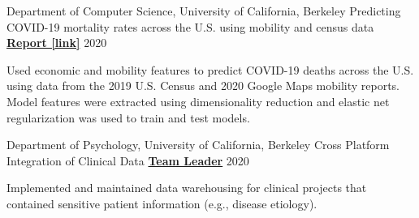 \begin{cventries}
  \cventry
    {Department of Computer Science, University of California, Berkeley} %
    {Predicting COVID-19 mortality rates across the U.S. using mobility and census data} %
    {\href{https://drive.google.com/file/d/1l9TLGLmstkJsvOJQPxHe_f35b4fEkDU4/view}{\textbf{Report [link]}}}
    {2020}
    {
      \begin{cvitems} %
      	\item {Used economic and mobility features to predict COVID-19 deaths across the U.S. using data from the 2019 U.S. Census and 2020 Google Maps mobility reports. Model features were extracted using dimensionality reduction and elastic net regularization was used to train and test models.}
      \end{cvitems}
    }
    
  \cventry 
    {Department of Psychology, University of California, Berkeley} %
    {Cross Platform Integration of Clinical Data}
    {\href{http://www.actcompthink.org/pubs/McDougleTsayEtAl_2021.pdf}{\textbf{Team Leader}}} %
    {2020} %
    {
      \begin{cvitems} %
      	\item {Implemented and maintained data warehousing for clinical projects that contained sensitive patient information (e.g., disease etiology).}
      \end{cvitems}
    } 
    
\end{cventries}


